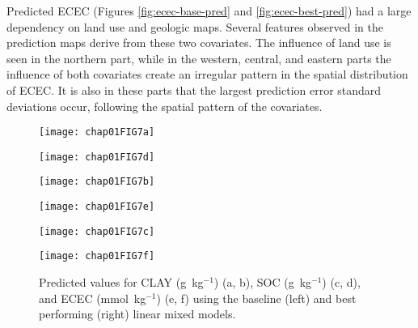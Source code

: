 Predicted ECEC (Figures \ref{fig:ecec-base-pred} and \ref{fig:ecec-best-pred}) 
had a large dependency on land use and geologic maps. Several features observed
in the prediction maps derive from these two covariates. The influence of land 
use is seen in the northern part, while in the western, central, and eastern 
parts the influence of both covariates create an irregular pattern in the 
spatial distribution of ECEC. It is also in these parts that the largest 
prediction error standard deviations occur, following the spatial pattern of 
the covariates.

 \begin{figure}[!ht]
    \centering
    \begin{minipage}[b]{63mm}
      \subcaption{}
      \label{fig:clay-base-pred}
      \centering
      \texttt{[image: chap01FIG7a]}
    \end{minipage}
    \begin{minipage}[b]{63mm}
      \subcaption{}
      \label{fig:clay-best-pred}
      \centering
      \texttt{[image: chap01FIG7d]}
    \end{minipage}
    \begin{minipage}[b]{63mm}
      \subcaption{}
      \label{fig:soc-base-pred}
      \centering
      \texttt{[image: chap01FIG7b]}
    \end{minipage}
    \begin{minipage}[b]{63mm}
      \subcaption{}
      \label{fig:soc-best-pred}
      \centering
      \texttt{[image: chap01FIG7e]}
    \end{minipage}
    \begin{minipage}[b]{63mm}
      \subcaption{}
      \label{fig:ecec-base-pred}
      \centering
      \texttt{[image: chap01FIG7c]}
    \end{minipage}
    \begin{minipage}[b]{63mm}
      \subcaption{}
      \label{fig:ecec-best-pred}
      \centering
      \texttt{[image: chap01FIG7f]}
    \end{minipage}
  \caption{Predicted values for CLAY (g~kg$^{-1}$) (a, b), SOC (g~kg$^{-1}$) 
  (c, d), and ECEC (mmol~kg$^{-1}$) (e, f) using the baseline (left) and best 
  performing (right) linear mixed models.}
  \label{fig:kriging}
\end{figure}

